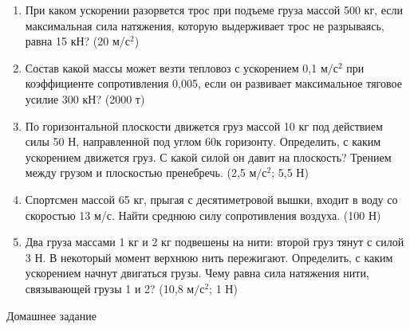 \documentclass[a5paper, 10pt]{diss_4}
\renewcommand{\'}{\,'}
\begin{document}
\begin{enumerate}

  \item При каком ускорении разорвется трос при подъеме груза массой 500 кг, если максимальная сила натяжения, которую выдерживает трос не разрываясь, равна 15 кН?
(20 $м/с^2$)

  \item Состав какой массы может везти тепловоз с ускорением 0,1 $м/с^2$ при коэффициенте сопротивления 0,005, если он развивает максимальное тяговое усилие 300 кН?
(2000 т)

  \item По горизонтальной плоскости движется груз массой 10 кг под действием силы 50 Н, направленной под углом 60\textdegree к горизонту. Определить, с каким ускорением движется груз. С какой силой он давит на плоскость? Трением между грузом и плоскостью пренебречь.
(2,5 $м/с^2$;    5,5 Н)

  \item Спортсмен массой 65 кг, прыгая с десятиметровой вышки, входит в воду со скоростью 13 м/с. Найти среднюю силу сопротивления воздуха.
(100 Н)

  \item Два груза массами 1 кг и 2 кг подвешены на нити: второй груз тянут с силой 3 Н. В некоторый момент верхнюю нить пережигают. Определить, с каким ускорением начнут двигаться грузы. Чему равна сила натяжения нити, связывающей грузы 1 и 2?
(10,8 $м/с^2$; 1 Н)

\end{enumerate}
\begin{center}
Домашнее задание
\end{center}
\end{document}
